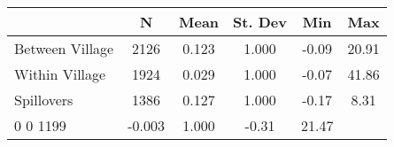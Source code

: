 \begin{tabular}{l*{5}{c}}\hline&\multicolumn{1}{c}{N}&\multicolumn{1}{c}{Mean}&\multicolumn{1}{c}{St. Dev}&\multicolumn{1}{c}{Min}&\multicolumn{1}{c}{Max}\\ \hline 
Between Village & 2126 & 0.123 & 1.000 & -0.09 & 20.91 \\
Within Village & 1924 & 0.029 & 1.000 & -0.07 & 41.86 \\
Spillovers & 1386 & 0.127 & 1.000 & -0.17 & 8.31 \\
0 0 1199 & -0.003 & 1.000 & -0.31 & 21.47 \\
\hline \end{tabular}
